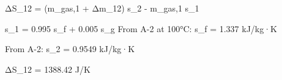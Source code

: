 ΔS_12 = (m_gas,1 + Δm_12) s_2 - m_gas,1 s_1  

s_1 = 0.995 s_f + 0.005 s_g  
From A-2 at 100°C:  
s_f = 1.337 kJ/kg·K  

From A-2:  
s_2 = 0.9549 kJ/kg·K  

ΔS_12 = 1388.42 J/K